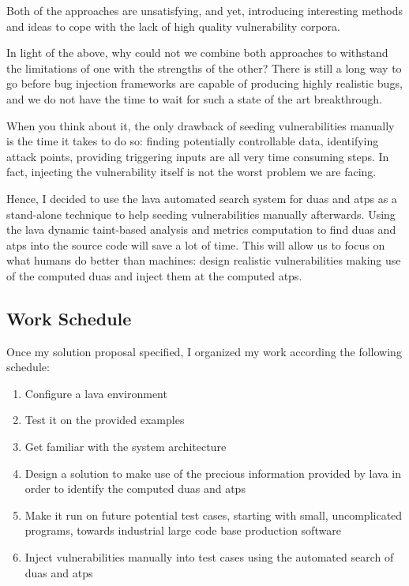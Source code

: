 Both of the approaches are unsatisfying, and yet, introducing interesting methods and ideas to cope with the lack of high quality vulnerability corpora.

In light of the above, why could not we combine both approaches to withstand the limitations of one with the strengths of the other? There is still a long way to go before bug injection frameworks are capable of producing highly realistic bugs, and we do not have the time to wait for such a state of the art breakthrough.

When you think about it, the only drawback of seeding vulnerabilities manually is the time it takes to do so: finding potentially controllable data, identifying attack points, providing triggering inputs are all very time consuming steps. In fact, injecting the vulnerability itself is not the worst problem we are facing.

Hence, I decided to use the \gls{lava} automated search system for \glspl{dua} and \glspl{atp} as a stand-alone technique to help seeding vulnerabilities manually afterwards. Using the \gls{lava} dynamic taint-based analysis and metrics computation to find \glspl{dua} and \glspl{atp} into the source code will save a lot of time. This will allow us to focus on what humans do better than machines: design realistic vulnerabilities making use of the computed \glspl{dua} and inject them at the computed \glspl{atp}.

\subsection{Work Schedule}

Once my solution proposal specified, I organized my work according the following schedule:

\begin{enumerate}
    \item Configure a \gls{lava} environment
    \item Test it on the provided examples
    \item Get familiar with the system architecture
    \item Design a solution to make use of the precious information provided by \gls{lava} in order to identify the computed \glspl{dua} and \glspl{atp}
    \item Make it run on future potential test cases, starting with small, uncomplicated programs, towards industrial large code base production software
    \item Inject vulnerabilities manually into test cases using the automated search of \glspl{dua} and \glspl{atp}
\end{enumerate}